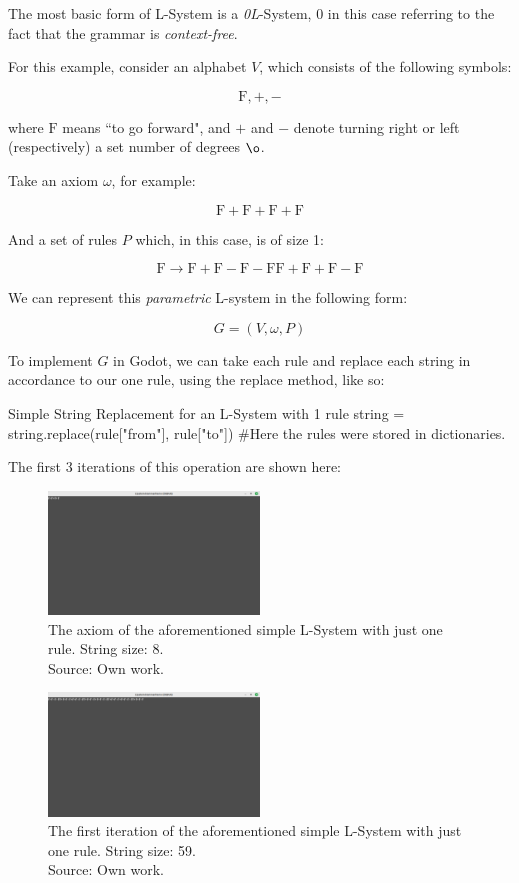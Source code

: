 The most basic form of L-System is a \emph{0L}-System, 0 in this case referring to the fact that the grammar is \emph{context-free}.

For this example\cite{lsyspaulbourke}, consider an alphabet $V$, which consists of the following symbols:

\newcommand{\F}{\mbox{F}}

$$ \F, +, - $$

where $\F$ means ``to go forward", and $+$ and $-$ denote turning right or left (respectively) a set number of degrees $\o$.

Take an axiom $\omega$, for example:

$$ \F+\F+\F+\F $$

And a set of rules $P$ which, in this case, is of size 1:

$$ \F \rightarrow \F+\F-\F-\F\F+\F+\F-\F $$

We can represent this \emph{parametric} L-system in the following form:\cite{enwiki:1124510226}

$$ G = (V, \omega, P) $$

To implement $G$ in Godot, we can take each rule and replace each string in accordance to our one rule, using the replace method, like so:

\begin{codeblock}{Simple String Replacement for an L-System with 1 rule}
string = string.replace(rule["from"], rule["to"]) #Here the rules were stored in dictionaries.
\end{codeblock}

The first 3 iterations of this operation are shown here:

\begin{figure}[H]
	\centering
	\includegraphics[width=0.5\textwidth]{Images/initial-l-system-iteration-0.png}
	\caption{The axiom of the aforementioned simple L-System with just one rule. String size: 8.\\Source: Own work.}
	\label{fig:lsysiter0}
\end{figure}

\begin{figure}[H]
	\centering
	\includegraphics[width=0.5\textwidth]{Images/initial-l-system-iteration-1.png}
	\caption{The first iteration of the aforementioned simple L-System with just one rule. String size: 59.\\Source: Own work.}
	\label{fig:lsysiter1}
\end{figure}

